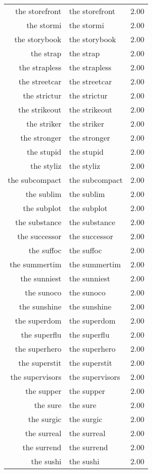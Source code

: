 \begin{table}[ht]
\begin{tabular}{rlr}
  the storefront & the storefront & 2.00 \\ 
  the stormi & the stormi & 2.00 \\ 
  the storybook & the storybook & 2.00 \\ 
  the strap & the strap & 2.00 \\ 
  the strapless & the strapless & 2.00 \\ 
  the streetcar & the streetcar & 2.00 \\ 
  the strictur & the strictur & 2.00 \\ 
  the strikeout & the strikeout & 2.00 \\ 
  the striker & the striker & 2.00 \\ 
  the stronger & the stronger & 2.00 \\ 
  the stupid & the stupid & 2.00 \\ 
  the styliz & the styliz & 2.00 \\ 
  the subcompact & the subcompact & 2.00 \\ 
  the sublim & the sublim & 2.00 \\ 
  the subplot & the subplot & 2.00 \\ 
  the substance & the substance & 2.00 \\ 
  the successor & the successor & 2.00 \\ 
  the suffoc & the suffoc & 2.00 \\ 
  the summertim & the summertim & 2.00 \\ 
  the sunniest & the sunniest & 2.00 \\ 
  the sunoco & the sunoco & 2.00 \\ 
  the sunshine & the sunshine & 2.00 \\ 
  the superdom & the superdom & 2.00 \\ 
  the superflu & the superflu & 2.00 \\ 
  the superhero & the superhero & 2.00 \\ 
  the superstit & the superstit & 2.00 \\ 
  the supervisors & the supervisors & 2.00 \\ 
  the supper & the supper & 2.00 \\ 
  the sure & the sure & 2.00 \\ 
  the surgic & the surgic & 2.00 \\ 
  the surreal & the surreal & 2.00 \\ 
  the surrend & the surrend & 2.00 \\ 
  the sushi & the sushi & 2.00 \\ 

\end{tabular}
\end{table}
